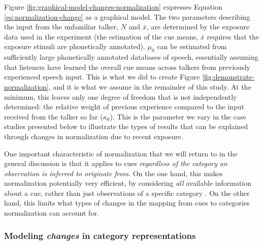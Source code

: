 \documentclass[
  11pt,
  man,floatsintext]{apa6}
\begin{document}
Figure \ref{fig:graphical-model-changes-normalization} expresses Equation \eqref{eq:normalization-change} as a graphical model. The two parameters describing the input from the unfamiliar talker, \(N\) and \(\bar{x}\), are determined by the exposure data used in the experiment (the estimation of the cue means, \(\bar{x}\) requires that the exposure stimuli are phonetically annotated). \(\mu_0\) can be estimated from sufficiently large phonetically annotated databases of speech, essentially assuming that listeners have learned the overall cue means across talkers from previously experienced speech input. This is what we did to create Figure \ref{fig:demonstrate-normalization}, and it is what we assume in the remainder of this study. At the minimum, this leaves only one degree of freedom that is not independently determined: the relative weight of previous experience compared to the input received from the talker so far (\(\kappa_0\)). This is the parameter we vary in the case studies presented below to illustrate the types of results that can be explained through changes in normalization due to recent exposure.

One important characteristic of normalization that we will return to in the general discussion is that it applies to cues \emph{regardless of the category an observation is inferred to originate from}. On the one hand, this makes normalization potentially very efficient, by considering \emph{all} available information about a cue, rather than just observations of a specific category \autocite{apfelbaum-mcmurray2015}. On the other hand, this limits what types of changes in the mapping from cues to categories normalization can account for.

\subsubsection{\texorpdfstring{Modeling \emph{changes} in category representations}{Modeling changes in category representations}}\label{sec:ideal-adaptor}
\end{document}
